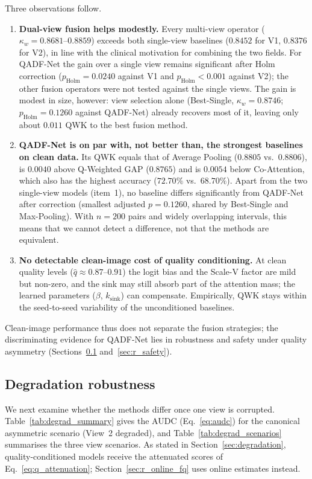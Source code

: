 \documentclass[final,5p,times,twocolumn,authoryear]{elsarticle}
\newcommand{\qadfnet}{QADF-Net}
\theoremstyle{plain}
\theoremstyle{remark}
\begin{document}
Three observations follow.
\begin{enumerate}
\item \textbf{Dual-view fusion helps modestly.} Every multi-view operator ($\kappa_w = 0.8681$--$0.8859$) exceeds both single-view baselines ($0.8452$ for V1, $0.8376$ for V2), in line with the clinical motivation for combining the two fields. For \qadfnet{} the gain over a single view remains significant after Holm correction ($p_{\text{Holm}}=0.0240$ against V1 and $p_{\text{Holm}}<0.001$ against V2); the other fusion operators were not tested against the single views. The gain is modest in size, however: view selection alone (Best-Single, $\kappa_w=0.8746$; $p_{\text{Holm}}=0.1260$ against \qadfnet{}) already recovers most of it, leaving only about $0.011$ QWK to the best fusion method.
\item \textbf{\qadfnet{} is on par with, not better than, the strongest baselines on clean data.} Its QWK equals that of Average Pooling ($0.8805$ vs.\ $0.8806$), is $0.0040$ above Q-Weighted GAP ($0.8765$) and is $0.0054$ below Co-Attention, which also has the highest accuracy ($72.70\%$ vs.\ $68.70\%$). Apart from the two single-view models (item~1), no baseline differs significantly from \qadfnet{} after correction (smallest adjusted $p=0.1260$, shared by Best-Single and Max-Pooling). With $n=200$ pairs and widely overlapping intervals, this means that we cannot detect a difference, not that the methods are equivalent.
\item \textbf{No detectable clean-image cost of quality conditioning.} At clean quality levels ($\hat q\approx0.87\text{--}0.91$) the logit bias and the Scale-V factor are mild but non-zero, and the sink may still absorb part of the attention mass; the learned parameters ($\beta$, $k_{\text{sink}}$) can compensate. Empirically, QWK stays within the seed-to-seed variability of the unconditioned baselines.
\end{enumerate}
Clean-image performance thus does not separate the fusion strategies; the discriminating evidence for \qadfnet{} lies in robustness and safety under quality asymmetry (Sections~\ref{sec:r_degrad} and~\ref{sec:r_safety}).

\subsection{Degradation robustness}
\label{sec:r_degrad}

We next examine whether the methods differ once one view is corrupted. Table~\ref{tab:degrad_summary} gives the AUDC (Eq.~\eqref{eq:audc}) for the canonical asymmetric scenario (View~2 degraded), and Table~\ref{tab:degrad_scenarios} summarises the three view scenarios. As stated in Section~\ref{sec:degradation}, quality-conditioned models receive the attenuated scores of Eq.~\eqref{eq:q_attenuation}; Section~\ref{sec:r_online_fq} uses online estimates instead.
\end{document}
